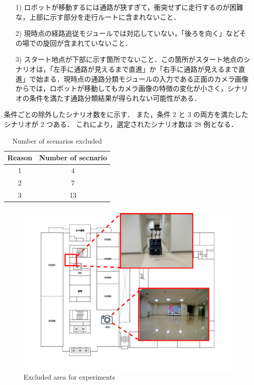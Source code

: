 \begin{enumerate}
  \item [1)] ロボットが移動するには通路が狭すぎて，衝突せずに走行するのが困難な，上部に示す部分を走行ルートに含まれないこと．
  \item [2)] 現時点の経路追従モジュールでは対応していない，「後ろを向く」などその場での旋回が含まれていないこと．
  \item [3)] スタート地点が下部に示す箇所でないこと．この箇所がスタート地点のシナリオは，「左手に通路が見えるまで直進」か「右手に通路が見えるまで直進」で始まる．現時点の通路分類モジュールの入力である正面のカメラ画像からでは，ロボットが移動してもカメラ画像の特徴の変化が小さく，シナリオの条件を満たす通路分類結果が得られない可能性がある．
\end{enumerate}

条件ごとの除外したシナリオ数をに示す．
また，条件 2 と 3 の両方を満たしたシナリオが 2 つある． 
これにより，選定されたシナリオ数は 28 例となる．
\begin{table}[htbp]
  \centering
  \caption{Number of scenarios excluded}\label{tab:remove}
  \begin{tabular}{c|c}
  \hline
  Reason & Number of secnario\\
  \hline
  1  & 4\\
  2  & 7\\
  3  & 13\\
  \hline
  \end{tabular}
\end{table}

\begin{figure}[h]
  \centering
  \includegraphics[width=130mm]{images/pdf/ishiguro/keepout.pdf}
  \caption{Excluded area for experiments}
  \label{fig:keepout}
\end{figure}

